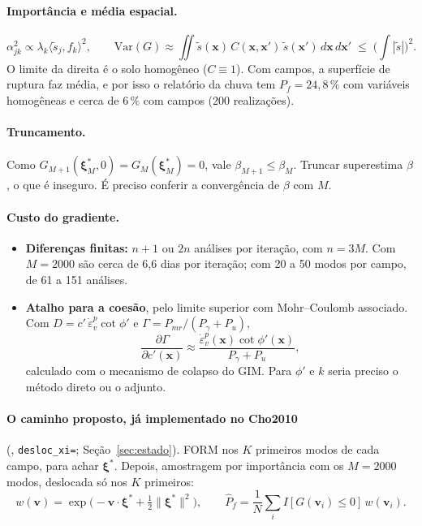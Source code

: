 \paragraph{Importância e média espacial.}
\begin{equation}
  \alpha_{jk}^2 \propto \lambda_k \langle \tilde s_j, f_k\rangle^2, \qquad
  \mathrm{Var}(G) \approx \iint \tilde s(\bm x)\, C(\bm x, \bm x')\, \tilde s(\bm x')\, d\bm x\, d\bm x'
  \;\leq\; \Big(\int |\tilde s|\Big)^2 .
\end{equation}
O limite da direita é o solo homogêneo ($C \equiv 1$). Com campos, a superfície de ruptura faz média, e por isso o
relatório da chuva tem $P_f = 24{,}8\,\%$ com variáveis homogêneas e cerca de 6\,\% com campos (200 realizações).

\paragraph{Truncamento.} Como $G_{M+1}(\bm\xi_M^*, 0) = G_M(\bm\xi_M^*) = 0$, vale $\beta_{M+1} \leq \beta_M$.
Truncar superestima $\beta$, o que é inseguro. É preciso conferir a convergência de $\beta$ com $M$.

\paragraph{Custo do gradiente.}
\begin{itemize}
  \item \textbf{Diferenças finitas:} $n + 1$ ou $2n$ análises por iteração, com $n = 3M$. Com $M = 2000$ são cerca de
    6,6 dias por iteração; com 20 a 50 modos por campo, de 61 a 151 análises.
  \item \textbf{Atalho para a coesão}, pelo limite superior com Mohr--Coulomb associado. Com
    $D = c'\,\dot\varepsilon_v^p\cot\phi'$ e $\Gamma = P_{mr}/(P_\gamma + P_u)$,
    \begin{equation}
      \frac{\partial\Gamma}{\partial c'(\bm x)} \approx \frac{\dot\varepsilon_v^p(\bm x)\cot\phi'(\bm x)}{P_\gamma + P_u},
    \end{equation}
    calculado com o mecanismo de colapso do GIM. Para $\phi'$ e $k$ seria preciso o método direto ou o adjunto.
\end{itemize}

\paragraph{O caminho proposto, já implementado no Cho2010} (, \texttt{desloc\_xi=};
Seção~\ref{sec:estado}). FORM nos $K$ primeiros modos de cada campo, para achar $\bm\xi^*$. Depois, amostragem
por importância com os $M = 2000$ modos, deslocada só nos $K$ primeiros:
\begin{equation}
  w(\bm v) = \exp\big(-\bm v\cdot\bm\xi^* + \tfrac12\|\bm\xi^*\|^2\big), \qquad
  \hat P_f = \frac1N\sum_i I[G(\bm v_i) \leq 0]\, w(\bm v_i).
\end{equation}

